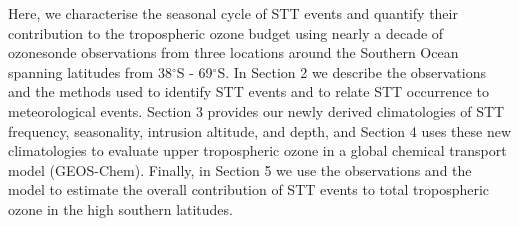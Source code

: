 

Here, we characterise the seasonal cycle of STT events and quantify their contribution to the tropospheric ozone budget using nearly a decade of ozonesonde observations from three locations around the Southern Ocean spanning latitudes from 38$^{\circ}$S - 69$^{\circ}$S. 
In Section 2 we describe the observations and the methods used to identify STT events and to relate STT occurrence to meteorological events.
Section 3 provides our newly derived climatologies of STT frequency, seasonality, intrusion altitude, and depth, and Section 4 uses these new climatologies to evaluate upper tropospheric ozone in a global chemical transport model (GEOS-Chem). 
Finally, in Section 5 we use the observations and the model to estimate the overall contribution of STT events to total tropospheric ozone in the high southern latitudes.
